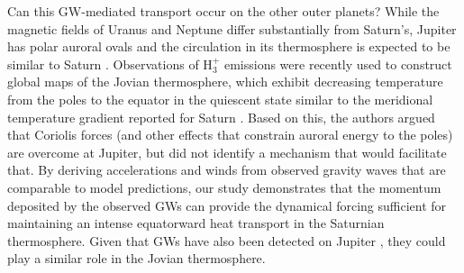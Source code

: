 Can this GW-mediated transport occur on the other outer planets? While the magnetic fields of Uranus and Neptune differ substantially from Saturn's, Jupiter has polar auroral ovals and the circulation in its thermosphere is expected to be similar to Saturn \cite{SA09}. Observations of H$_3^+$ emissions were recently used to construct global maps of the Jovian thermosphere, which exhibit decreasing temperature from the poles to the equator in the quiescent state \cite{O'Donoghue21} similar to the meridional temperature gradient reported for Saturn \cite{Brown20}. Based on this, the authors argued that Coriolis forces (and other effects that constrain auroral energy to the poles) are overcome at Jupiter, but did not identify a mechanism that would facilitate that. By deriving accelerations and winds from observed gravity waves that are comparable to model predictions, our study demonstrates that the momentum deposited by the observed GWs can provide the dynamical forcing sufficient for maintaining an intense equatorward heat transport in the Saturnian thermosphere. Given that GWs have also been detected on Jupiter \cite{Young_etal97}, they could play a similar role in the Jovian thermosphere.

